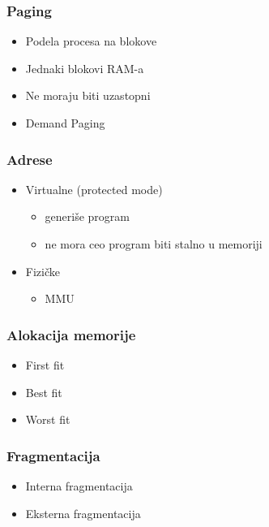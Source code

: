 \documentclass{beamer}
\begin{document}
\begin{frame}
    \frametitle{Paging}
    \begin{itemize}
        \item Podela procesa na blokove \newline
        \item Jednaki blokovi RAM-a \newline
        \item Ne moraju biti uzastopni \newline
        \item Demand Paging
    \end{itemize}
\end{frame}

\begin{frame}
    \frametitle{Adrese}
    \begin{itemize}
        \item Virtualne (protected mode) \begin{itemize}
            \item generiše program \newline
            \item ne mora ceo program biti stalno u memoriji \newline
        \end{itemize}
        \item Fizičke \begin{itemize}
            \item MMU
        \end{itemize}
    \end{itemize}
\end{frame}

\begin{frame}
    \frametitle{Alokacija memorije}
    \begin{itemize}
        \item First fit \newline
        \item Best fit \newline
        \item Worst fit
    \end{itemize}
\end{frame}

\begin{frame}
    \frametitle{Fragmentacija}
    \begin{itemize}
        \item Interna fragmentacija \newline
        \item Eksterna fragmentacija
    \end{itemize}
\end{frame}
\end{document}
